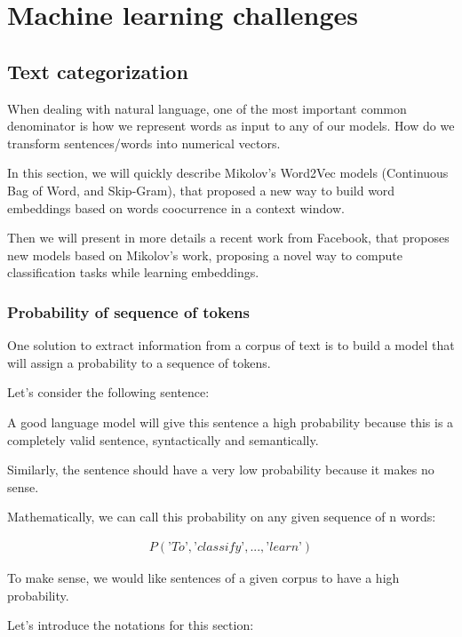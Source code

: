 \chapter{Machine learning challenges}
\label{cha:results}


\section{Text categorization}

When dealing with natural language, one of the most important common denominator is how we represent words as input to any of our models. How do we transform sentences/words into numerical vectors.

In this section, we will quickly describe Mikolov's Word2Vec models (Continuous Bag of Word, and Skip-Gram), that proposed a new way to build word embeddings based on words coocurrence in a context window.

Then we will present in more details a recent work from Facebook, that proposes new models based on Mikolov's work, proposing a novel way to compute classification tasks while learning embeddings.

\subsection{Probability of sequence of tokens}

One solution to extract information from a corpus of text is to build a model that will assign a probability to a sequence of tokens. 

Let's consider the following sentence: 

A good language model will give this sentence a high probability because this is a completely valid sentence, syntactically and semantically.

Similarly, the sentence  should have a very low probability because it makes no sense. 

Mathematically, we can call this probability on any given sequence of n words:

\begin{align}
	P(\textit{'To'},\textit{'classify'}, ..., \textit{'learn'})
\end{align}

To make sense, we would like sentences of a given corpus to have a high probability.

Let's introduce the notations for this section:

